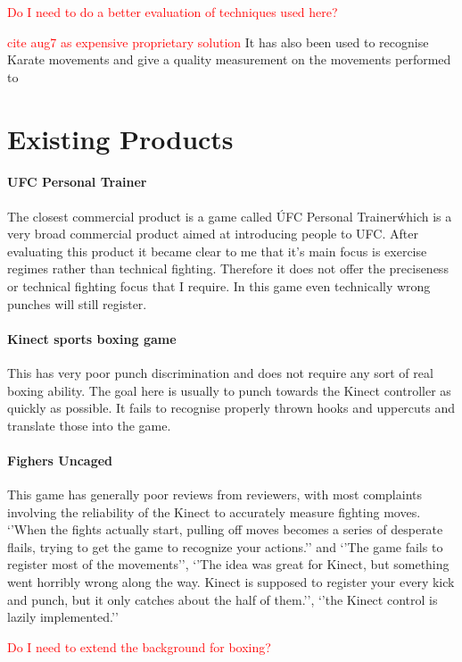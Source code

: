 \textcolor{red}{Do I need to do a better evaluation of techniques used here?}

\textcolor{red}{cite aug7 as expensive proprietary solution}
It has also been used to recognise Karate movements and give a quality measurement on the movements performed to 

\section{Existing Products}
\paragraph{UFC Personal Trainer}
The closest commercial product is a game called \'UFC Personal Trainer\' which is a very broad commercial product aimed at introducing people to UFC. After evaluating this product it became clear to me that it’s main focus is  exercise regimes rather than technical fighting. Therefore it does not offer the preciseness or technical fighting focus that I require. In this game even technically wrong punches will still register.

\paragraph{Kinect sports boxing game}
This has very poor punch discrimination and does not require any sort of real boxing ability. The goal here is usually to punch towards the Kinect controller as quickly as possible. It fails to recognise properly thrown hooks and uppercuts and translate those into the game. 

\paragraph{Fighers Uncaged}
This game has generally poor reviews from reviewers, with most complaints involving the reliability of the Kinect to accurately measure fighting moves. \cite{gamerev1} `'When the fights actually start, pulling off moves becomes a series of desperate flails, trying to get the game to recognize your actions.''\cite{gamerev2} 
and `'The game fails to register most of the movements'', `'The idea was great for Kinect, but something went horribly wrong along the way. Kinect is supposed to register your every kick and punch, but it only catches about the half of them.'', `'the Kinect control is lazily implemented.''\cite{gamerev3}


\textcolor{red}{Do I need to extend the background for boxing?}
